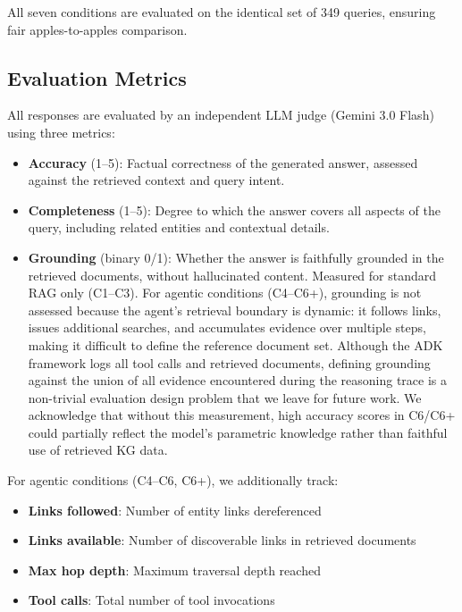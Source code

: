 \documentclass[runningheads]{llncs}
\begin{document}
All seven conditions are
evaluated on the identical set of 349 queries, ensuring fair
apples-to-apples comparison.

\subsection{Evaluation Metrics}

All responses are evaluated by an independent LLM judge (Gemini 3.0 Flash) using
three metrics:

\begin{itemize}
    \item \textbf{Accuracy} (1--5): Factual correctness of the generated
          answer, assessed against the retrieved context and query intent.
    \item \textbf{Completeness} (1--5): Degree to which the answer covers
          all aspects of the query, including related entities and
          contextual details.
    \item \textbf{Grounding} (binary 0/1): Whether the answer is
          faithfully grounded in the retrieved documents, without
          hallucinated content. Measured for standard RAG only (C1--C3).
          For agentic conditions (C4--C6+), grounding is not assessed
          because the agent's retrieval boundary is dynamic: it
          follows links, issues additional searches, and accumulates
          evidence over multiple steps, making it difficult to define
          the reference document set.  Although the ADK framework
          logs all tool calls and retrieved documents, defining grounding
          against the union of all evidence encountered during the
          reasoning trace is a non-trivial evaluation design problem
          that we leave for future work.  We acknowledge that without
          this measurement, high accuracy scores in C6/C6+ could
          partially reflect the model's parametric knowledge rather
          than faithful use of retrieved KG data.
\end{itemize}

For agentic conditions (C4--C6, C6+), we additionally track:
\begin{itemize}
    \item \textbf{Links followed}: Number of entity links dereferenced
    \item \textbf{Links available}: Number of discoverable links in
          retrieved documents
    \item \textbf{Max hop depth}: Maximum traversal depth reached
    \item \textbf{Tool calls}: Total number of tool invocations
\end{itemize}
\end{document}
